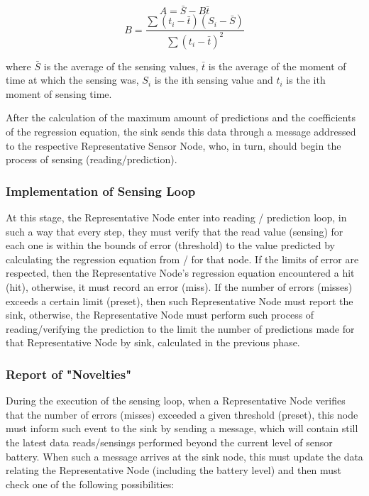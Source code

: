 \documentclass[conference]{IEEEtran}
\begin{document}
$$
A = \bar{S} - B\bar{t}
$$
$$
B = \frac{\sum(t_i-\bar{t})(S_i-\bar{S})}{\sum(t_i-\bar{t})^2}
$$

where
$\bar{S}$ is the average of the sensing values,
$\bar{t}$ is the average of the moment of time at which the sensing was,
$S_i$ is the ith sensing value and 
$t_i$ is the ith moment of sensing time.

After the calculation of the maximum amount of predictions and the coefficients
of the regression equation, the sink sends this data through a message addressed
to the respective Representative Sensor Node, who, in turn, should begin the
process of sensing (reading/prediction).

\subsubsection{Implementation of Sensing Loop}

At this stage, the Representative Node enter into reading / prediction loop, in
such a way that every step, they must verify that the read value (sensing) for
each one is within the bounds of error (threshold) to the value predicted by
calculating the regression equation from / for that node. If the limits of error
are respected, then the Representative Node's regression equation encountered a
hit (hit), otherwise, it must record an error (miss). If the number of errors
(misses) exceeds a certain limit (preset), then such Representative Node must
report the sink, otherwise, the Representative Node must perform such process of
reading/verifying the prediction to the limit the number of predictions made for
that Representative Node by sink, calculated in the previous phase.

\subsubsection{Report of "Novelties"}

During the execution of the sensing loop, when a Representative Node verifies
that the number of errors (misses) exceeded a given threshold (preset), this
node must inform such event to the sink by sending a message, which will contain
still the latest data reads/sensings performed beyond the current level of
sensor battery. When such a message arrives at the sink node, this must update
the data relating the Representative Node (including the battery level) and then
must check one of the following possibilities:
\end{document}
